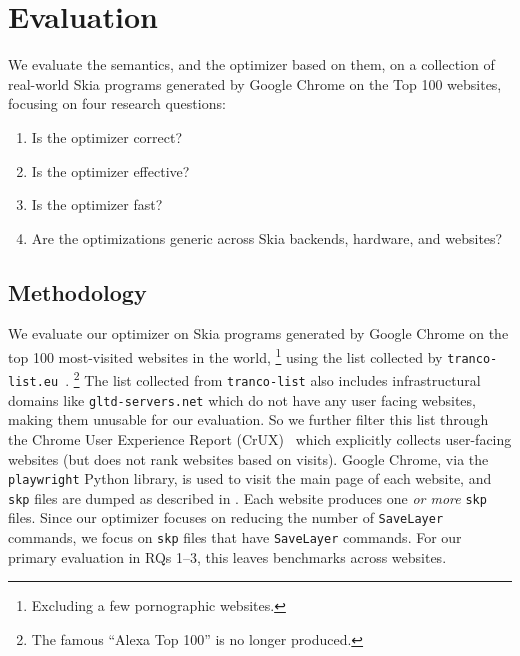 \documentclass[main.tex]{subfiles}
\begin{document}
\section{Evaluation}
\label{sec:eval}

We evaluate the \muskia semantics, and the optimizer based on them,
  on a collection of real-world Skia programs
  generated by Google Chrome on the Top 100 websites,
  focusing on four research questions:

\begin{enumerate}
\item[RQ1] Is the optimizer correct? %
\item[RQ2] Is the optimizer effective? %
\item[RQ3] Is the optimizer fast? %
\item[RQ4] Are the optimizations generic across Skia backends, hardware, and websites? %
\end{enumerate}

\subsection{Methodology}

We evaluate our optimizer on Skia programs
  generated by Google Chrome on the
  top 100 most-visited websites in the world,%
\footnote{Excluding a few pornographic websites.}
  using the list collected by \texttt{tranco-list.eu}~\cite{trancolist}.%
\footnote{The famous ``Alexa Top 100'' is no longer produced.}
The list collected from \texttt{tranco-list} also includes
  infrastructural domains like \texttt{gltd-servers.net}
  which do not have any user facing websites, making them unusable for our evaluation.
So we further filter this list through the Chrome User Experience Report (CrUX)~\cite{crux}
  which explicitly collects user-facing websites (but does not rank websites based on visits).
Google Chrome, via the \texttt{playwright} Python library, is used to visit
  the main page of each website,
  and \texttt{skp} files are dumped as described in .
Each website produces one \emph{or more} \texttt{skp} files.
Since our optimizer focuses on reducing
  the number of \texttt{SaveLayer} commands,
  we focus on \texttt{skp} files that have \texttt{SaveLayer} commands.
For our primary evaluation in RQs 1--3,
  this leaves \graphiteAppleNumBench benchmarks across \N websites.
\end{document}
